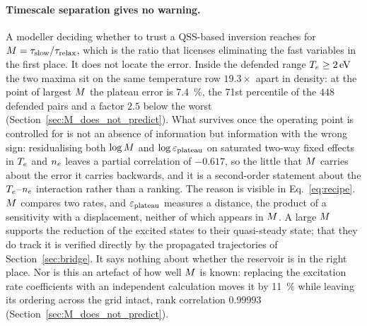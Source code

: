 \paragraph{Timescale separation gives no warning.} A modeller deciding whether
to trust a QSS-based inversion reaches for $M = \tau_{\mathrm{slow}}/\tau_{\mathrm{relax}}$, which is
the ratio that licenses eliminating the fast variables in the first place. It
does not locate the error. Inside the defended range
$T_e\ge\SI{2}{\electronvolt}$ the two maxima sit on the same temperature row
$19.3\times$ apart in density: at the point of largest $M$ the plateau error
is \SI{7.4}{\percent}, the 71st percentile of the $448$ defended pairs and a
factor $2.5$ below the worst
(Section~\ref{sec:M_does_not_predict}). What survives once the operating point
is controlled for is not an absence of information but information with the
wrong sign: residualising both $\log M$ and $\log\varepsilon_{\mathrm{plateau}}$ on saturated
two-way fixed effects in $T_e$ and $n_e$ leaves a partial correlation of
$-0.617$, so the little that $M$ carries about the error it carries
backwards, and it is a second-order statement about the $T_e$--$n_e$
interaction rather than a ranking. The reason is visible in Eq.~\eqref{eq:recipe}. $M$
compares two rates, and $\varepsilon_{\mathrm{plateau}}$ measures a distance, the product of a
sensitivity with a displacement, neither of which appears in $M$. A large
$M$ supports the reduction of the excited states to their quasi-steady
state; that they do track it is verified directly by the propagated
trajectories of Section~\ref{sec:bridge}. It says nothing about whether the
reservoir is in the right place. Nor is this an
artefact of how well $M$ is known: replacing the excitation rate
coefficients with an independent calculation moves it by \SI{11}{\percent}
while leaving its ordering across the grid intact, rank correlation $0.99993$
(Section~\ref{sec:M_does_not_predict}).

